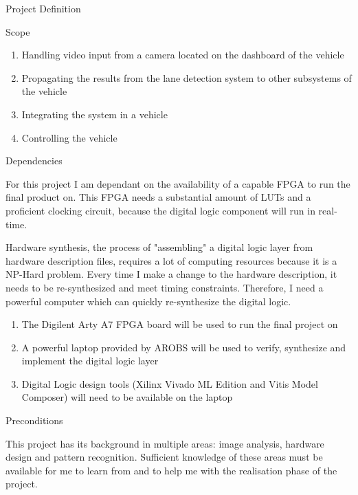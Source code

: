\documentclass{matthijs}
\begin{document}
\begin{hoofdstuk}{Project Definition}
\begin{paragraaf}{Scope}
\begin{enumerate}
				\item Handling video input from a camera located on the dashboard of the vehicle
				\item Propagating the results from the lane detection system to other subsystems of the vehicle
				\item Integrating the system in a vehicle
				\item Controlling the vehicle
			
			\end{enumerate}

		\end{paragraaf}

		\begin{paragraaf}{Dependencies}

			For this project I am dependant on the availability of a capable FPGA to run the final product on.
			This FPGA needs a substantial amount of LUTs and a proficient clocking circuit, because the digital logic component will run in real-time.
			
			Hardware synthesis, the process of "assembling" a digital logic layer from hardware description files, requires a lot of computing resources because it is a NP-Hard \cite{chu2006rtl} problem.
			Every time I make a change to the hardware description, it needs to be re-synthesized and meet timing constraints.
			Therefore, I need a powerful computer which can quickly re-synthesize the digital logic.

			\begin{enumerate}

				\item The Digilent Arty A7 FPGA board will be used to run the final project on
				\item A powerful laptop provided by AROBS will be used to verify, synthesize and implement the digital logic layer
				\item Digital Logic design tools (Xilinx Vivado ML Edition and Vitis Model Composer) will need to be available on the laptop
		
			\end{enumerate}

		\end{paragraaf}

		\begin{paragraaf}{Preconditions}

			This project has its background in multiple areas: image analysis, hardware design and pattern recognition.
			Sufficient knowledge of these areas must be available for me to learn from and to help me with the realisation phase of the project.


\end{paragraaf}
\end{hoofdstuk}
\end{document}
